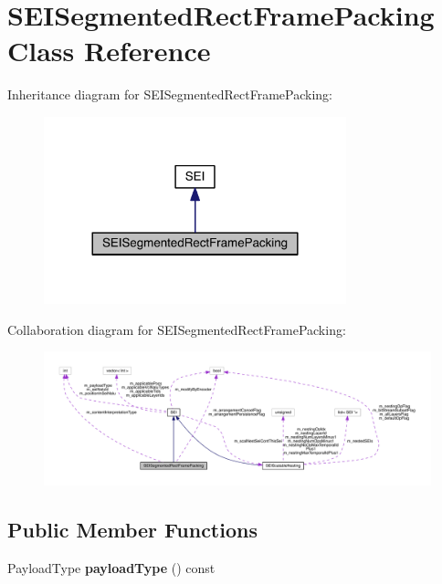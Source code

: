 \hypertarget{class_s_e_i_segmented_rect_frame_packing}{}\section{S\+E\+I\+Segmented\+Rect\+Frame\+Packing Class Reference}
\label{class_s_e_i_segmented_rect_frame_packing}


Inheritance diagram for S\+E\+I\+Segmented\+Rect\+Frame\+Packing\+:
\nopagebreak
\begin{figure}[H]
\begin{center}
\leavevmode
\includegraphics[width=248pt]{da/de6/class_s_e_i_segmented_rect_frame_packing__inherit__graph}
\end{center}
\end{figure}


Collaboration diagram for S\+E\+I\+Segmented\+Rect\+Frame\+Packing\+:
\nopagebreak
\begin{figure}[H]
\begin{center}
\leavevmode
\includegraphics[width=350pt]{dc/db2/class_s_e_i_segmented_rect_frame_packing__coll__graph}
\end{center}
\end{figure}
\subsection*{Public Member Functions}
\begin{DoxyCompactItemize}
\item 
\mbox{\label{class_s_e_i_segmented_rect_frame_packing_adf0dfacc7023aae65d9be62c5105026b}} 
Payload\+Type {\bfseries payload\+Type} () const
\end{DoxyCompactItemize}
